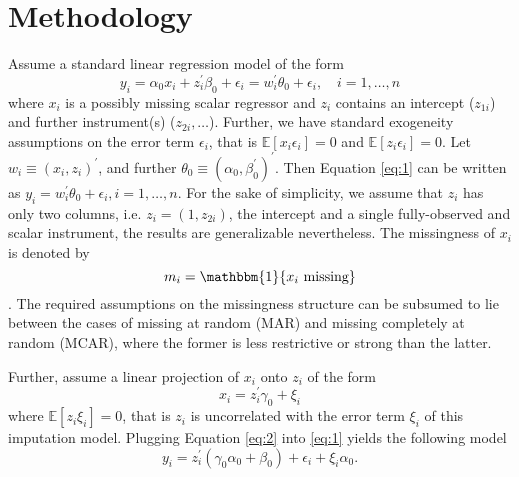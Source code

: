 \section{Methodology}
Assume a standard linear regression model of the form
\begin{equation}\label{eq:1}
    y_i = \alpha_0 x_i + z_i^{\prime} \beta_0 + \epsilon_i = w_i^{\prime} \theta_0 + \epsilon_i, \quad i= 1,\ldots,n
\end{equation}
where $x_i$ is a possibly missing scalar regressor and $z_i$ contains an intercept ($z_{1i}$) and further instrument(s) ($z_{2i}, \ldots$).
Further, we have standard exogeneity assumptions on the error term $\epsilon_i$, that is $\mathbb{E}[x_i \epsilon_i] = 0$ and $\mathbb{E}[z_i \epsilon_i] = 0$.
Let $w_i \equiv (x_i, z_i)^{\prime}$, and further $\theta_0 \equiv (\alpha_0, \beta_0^{\prime})^{\prime}$.
Then Equation \eqref{eq:1} can be written as $y_i = w_i^{\prime} \theta_0 + \epsilon_i, i= 1,\ldots,n$.
For the sake of simplicity, we assume that $z_i$ has only two columns, i.e. $z_i = (1, z_{2i})$, the intercept and a single fully-observed and scalar instrument, the results are generalizable nevertheless.
The missingness of $x_i$ is denoted by $$m_i = \mathbbm{1}\{x_i \text{ missing}\}$$.
The required assumptions on the missingness structure can be subsumed to lie between the cases of missing at random (MAR) and missing completely at random (MCAR), where the former is less restrictive or strong than the latter.

Further, assume a linear projection of $x_i$ onto $z_i$ of the form
\begin{equation}\label{eq:2}
    x_i = z_i^{\prime} \gamma_0 + \xi_i
\end{equation}
where $\mathbb{E}[z_i \xi_i] = 0$, that is $z_i$ is uncorrelated with the error term $\xi_i$ of this imputation model.
Plugging Equation \eqref{eq:2} into \eqref{eq:1} yields the following model
\begin{equation}\label{eq:3}
    y_i = z_i^{\prime} (\gamma_0 \alpha_0 + \beta_0) + \epsilon_i + \xi_i \alpha_0 .
\end{equation}

